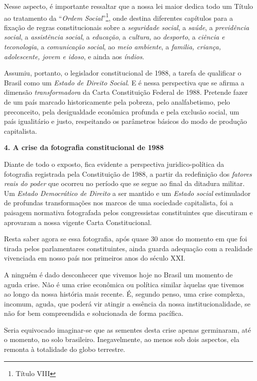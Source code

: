 Nesse aspecto, é importante ressaltar que a nossa lei maior dedica todo
um Título ao tratamento da ``\emph{Ordem Social}''\footnote{Título VIII},
onde destina diferentes capítulos para a fixação de regras
constitucionais sobre a \emph{seguridade social}, a \emph{saúde}, a
\emph{previdência social}, a \emph{assistência social}, a
\emph{educação}, a \emph{cultura,} ao \emph{desporto}, a \emph{ciência e
teconologia}, a \emph{comunicação social}, ao \emph{meio ambiente}, a
\emph{familia, criança, adolescente, jovem e idoso}, e ainda aos
\emph{índios}.

Assumiu, portanto, o legislador constitucional de 1988, a tarefa de
qualificar o Brasil como um \emph{Estado de Direito Social}. E é nessa
perspectiva que se afirma a dimensão \emph{transformadora} da Carta
Constituição Federal de 1988. Pretende fazer de um país marcado
historicamente pela pobreza, pelo analfabetismo, pelo preconceito, pela
desigualdade econômica profunda e pela exclusão social, um país
igualitário e justo, respeitando os parâmetros básicos do modo de
produção capitalista.

\textbf{4. A crise da fotografia constitucional de 1988}

Diante de todo o exposto, fica evidente a perspectiva juridico-política
da fotografia registrada pela Constituição de 1988, a partir da
redefinição dos \emph{fatores reais do poder} que ocorreu no período que
se segue ao final da ditadura militar. Um \emph{Estado Democrático de
Direito} a ser mantido e um \emph{Estado social} estimulador de
profundas transformações nos marcos de uma sociedade capitalista, foi a
paisagem normativa fotografada pelos congressistas constituintes que
discutiram e aprovaram a nossa vigente Carta Constitucional.

Resta saber agora se essa fotografia, após quase 30 anos do momento em
que foi tirada pelos parlamentares constituintes, ainda guarda adequação
com a realidade vivenciada em nosso país nos primeiros anos do século
XXI.

A ninguém é dado desconhecer que vivemos hoje no Brasil um momento de
aguda crise. Não é uma crise econômica ou política similar àquelas que
tivemos ao longo da nossa história mais recente. É, segundo penso, uma
crise complexa, incomum, aguda, que poderá vir atingir a essência da
nossa institucionalidade, se não for bem compreendida e solucionada de
forma pacífica.

Seria equivocado imaginar-se que as sementes desta crise apenas
germinaram, até o momento, no solo brasileiro. Inegavelmente, ao menos
sob dois aspectos, ela remonta à totalidade do globo terrestre.

